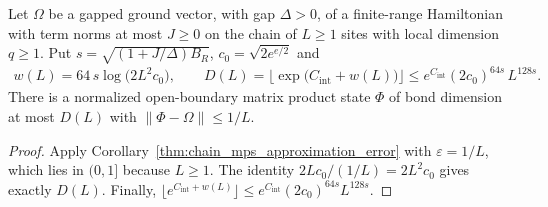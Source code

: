 \begin{theorem}
    \label{thm:chain_mps_approximation}
    \leanok
    Let $\Omega$ be a gapped ground vector, with gap $\Delta>0$, of a
    finite-range Hamiltonian with term norms at most $J\ge0$ on the chain of
    $L\ge1$ sites with local dimension $q\ge1$. Put
    $s=\sqrt{(1+J/\Delta)B_R}$, $c_0=\sqrt{2e^{e/2}}$ and
    \begin{align}
        w(L)=64\,s\log\bigl(2L^2c_0\bigr),\qquad
        D(L)=\bigl\lfloor\exp\bigl(C_{\mathrm{int}}+w(L)\bigr)\bigr\rfloor
        \le e^{C_{\mathrm{int}}}(2c_0)^{64s}\,L^{128s}.
    \end{align}
    There is a normalized open-boundary matrix product state $\Phi$ of bond
    dimension at most $D(L)$ with $\|\Phi-\Omega\|\le1/L$.
\end{theorem}
\begin{proof}
    \leanok
    Apply Corollary~\ref{thm:chain_mps_approximation_error} with
    $\varepsilon=1/L$, which lies in $(0,1]$ because $L\ge1$.
    The identity $2Lc_0/(1/L)=2L^2c_0$ gives exactly $D(L)$.
    Finally, $\lfloor e^{C_{\mathrm{int}}+w(L)}\rfloor
        \le e^{C_{\mathrm{int}}}(2c_0)^{64s}L^{128s}$.
\end{proof}

